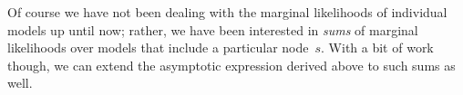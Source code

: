 \documentclass[12pt,a4paper]{article}
\begin{document}
Of course we have not been dealing with the marginal likelihoods of individual
models up until now; rather, we have been interested in \emph{sums} of marginal
likelihoods over models that include a particular node~\(s\). With a bit of work
though, we can extend the asymptotic expression derived above to such sums as
well.

\end{document}
